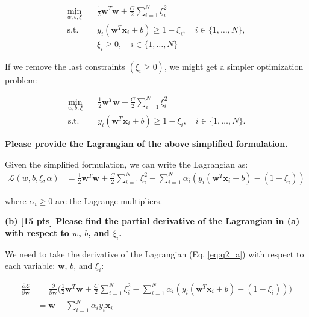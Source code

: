 \begin{align}
    \min_{w, b, \xi} \quad & \frac{1}{2} \mathbf{w}^T \mathbf{w} + \frac{C}{2} \sum_{i=1}^{N} \xi_i^2 \label{eq:svm_objective} \\
    \text{s.t.} \quad & y_i (\mathbf{w}^T \mathbf{x}_i + b) \geq 1 - \xi_i, \quad i \in \{1, \ldots, N\}, \nonumber \\
    & \xi_i \geq 0, \quad i \in \{1, \ldots, N\} \nonumber
\end{align}

If we remove the last constraints \((\xi_i \geq 0)\), we might get a simpler optimization problem:

\begin{align}
    \min_{w, b, \xi} \quad & \frac{1}{2} \mathbf{w}^T \mathbf{w} + \frac{C}{2} \sum_{i=1}^{N} \xi_i^2 \label{eq:svm_objective2} \\
    \text{s.t.} \quad & y_i (\mathbf{w}^T \mathbf{x}_i + b) \geq 1 - \xi_i, \quad i \in \{1, \ldots, N\}. \nonumber
\end{align}


\textbf{Please provide the Lagrangian of the above simplified formulation.}

Given the simplified formulation, we can write the Lagrangian as:
\begin{align}
  \mathcal{L}(w, b, \xi, \alpha) &= \frac{1}{2} \mathbf{w}^T \mathbf{w} + \frac{C}{2} \sum_{i=1}^{N} \xi_i^2 - \sum_{i=1}^{N} \alpha_i \left( y_i (\mathbf{w}^T \mathbf{x}_i + b) - (1 - \xi_i) \right) \label{eq:q2_a}
\end{align}

where $\alpha_i \geq 0$ are the Lagrange multipliers.


\textbf{(b) [15 pts] Please find the partial derivative of the Lagrangian in (a) with respect to $w$, $b$, and $\xi_i$.
}

We need to take the derivative of the Lagrangian (Eq. \ref{eq:q2_a}) with respect to each variable: $\mathbf{w}$, $b$, and $\xi_i$:

\begin{align}
  \frac{\partial \mathcal{L}}{\partial \mathbf{w}} &= \frac{\partial}{\partial \mathbf{w}} \Bigg( \frac{1}{2} \mathbf{w}^T \mathbf{w} + \frac{C}{2} \sum_{i=1}^{N} \xi_i^2 - \sum_{i=1}^{N} \alpha_i \left( y_i (\mathbf{w}^T \mathbf{x}_i + b) - (1 - \xi_i) \right) \Bigg) \nonumber \label{eq:q2_b_1} \\
  &= \mathbf{w} - \sum_{i=1}^{N} \alpha_i y_i \mathbf{x}_i
\end{align}

